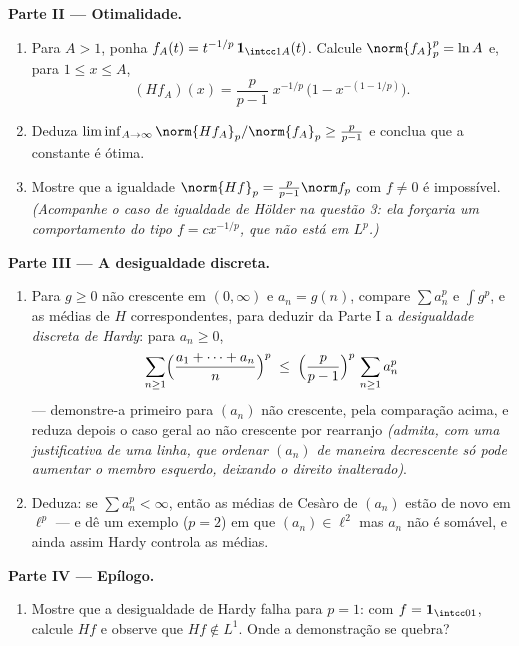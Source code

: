 \begin{problem}
\medskip
\noindent\textbf{Parte II --- Otimalidade.}
\begin{enumerate}[resume]
  \item Para $A > 1$, ponha $f_A(t) = t^{-1/p}\,\mathbf
        1_{\intcc1A}(t)$. Calcule $\norm{f_A}_p^p = \ln A$ e, para $1 \leq x \leq A$,
        \[
        (Hf_A)(x) = \frac p{p-1}\;x^{-1/p}\,
        \bigl(1 - x^{-(1 - 1/p)}\bigr).
        \]
  \item Deduza $\liminf_{A\to\infty} \norm{Hf_A}_p/
        \norm{f_A}_p \geq \frac{p}{p-1}$ e conclua que a constante é ótima.
  \item Mostre que a igualdade $\norm{Hf}_p = \frac
        p{p-1}\norm f_p$ com $f \neq 0$ é impossível.
        \emph{(Acompanhe o caso de igualdade de Hölder na questão 3:
        ela forçaria um comportamento do tipo $f = cx^{-1/p}$, que não está em
        $L^p$.)}
\end{enumerate}

\medskip
\noindent\textbf{Parte III --- A desigualdade discreta.}
\begin{enumerate}[resume]
  \item Para $g \geq 0$ não crescente em $(0,\infty)$ e $a_n = g(n)$, compare $\sum a_n^p$ e $\int g^p$,
        e as médias de $H$ correspondentes, para deduzir da Parte I
        a \emph{desigualdade discreta de Hardy}: para $a_n \geq 0$,
        \[
        \sum_{n\geq1}\Bigl(\frac{a_1 + \dots +
        a_n}{n}\Bigr)^{p}
        \;\leq\;
        \Bigl(\frac{p}{p-1}\Bigr)^{p}\,\sum_{n\geq1}a_n^p
        \]
        --- demonstre-a primeiro para $(a_n)$ não crescente, pela
        comparação acima, e reduza depois o caso geral ao não crescente
        por rearranjo \emph{(admita, com uma justificativa de uma
        linha, que ordenar $(a_n)$ de maneira decrescente só pode
        aumentar o membro esquerdo, deixando o direito inalterado)}.
  \item Deduza: se $\sum a_n^p < \infty$, então as médias de Cesàro de $(a_n)$ estão
        de novo em $\ell^p$ --- e dê um exemplo ($p = 2$) em que
        $(a_n) \in \ell^2$ mas $a_n$ não é somável, e ainda assim Hardy controla
        as médias.
\end{enumerate}

\medskip
\noindent\textbf{Parte IV --- Epílogo.}
\begin{enumerate}[resume]
  \item Mostre que a desigualdade de Hardy falha para $p = 1$: com
        $f = \mathbf 1_{\intcc01}$, calcule $Hf$ e observe que $Hf \notin L^1$. Onde a demonstração
        se quebra?
\end{enumerate}


\end{problem}
